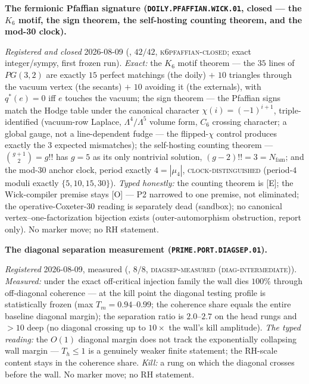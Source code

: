 \documentclass[11pt,a4paper]{article}
\newcommand{\Nfam}{N_{\mathrm{fam}}}
\begin{document}
\par\smallskip\noindent\textbf{The fermionic Pfaffian signature
(\texttt{DOILY.PFAFFIAN.\allowbreak WICK.01}, closed --- the
$K_6$ motif, the sign theorem, the self-hosting counting
theorem, and the mod-30 clock).}
{\sloppy
\emph{Registered and closed} 2026-08-09
(, $42/42$,
\textsc{k6pfaffian-closed}; exact integer/sympy, first frozen
run).  \emph{Exact:} the $K_6$ motif theorem --- the $35$ lines
of $PG(3,2)$ are exactly $15$ perfect matchings (the doily) $+$
$10$ triangles through the vacuum vertex (the secants) $+$ $10$
avoiding it (the externals), with $q^{*}(e) = 0$ iff $e$
touches the vacuum; the sign theorem --- the Pfaffian signs
match the Hodge table under the canonical character $\chi(i) =
(-1)^{i+1}$, triple-identified (vacuum-row Laplace,
$\Lambda^4/\Lambda^5$ volume form, $C_6$ crossing character; a
global gauge, not a line-dependent fudge --- the flipped-$\chi$
control produces exactly the $3$ expected mismatches); the
self-hosting counting theorem --- $\binom{g+1}{2} = g!!$ has $g
= 5$ as its only nontrivial solution, $(g-2)!! = 3 = \Nfam$;
and the mod-$30$ anchor clock, period exactly $4 = |\mu_4|$,
\textsc{clock-distinguished} (period-$4$ moduli exactly $\{5,
10, 15, 30\}$).  \emph{Typed honestly:} the counting theorem is
[E]; the Wick-compiler premise stays [O] --- P2 narrowed to one
premise, not eliminated; the operative-Coxeter-$30$ reading is
separately dead (sandbox); no canonical
vertex--one-factorization bijection exists (outer-automorphism
obstruction, report only).  No marker move; no RH
statement.\par}

\par\smallskip\noindent\textbf{The diagonal separation
measurement (\texttt{PRIME.PORT.\allowbreak DIAGSEP.01}).}
{\sloppy
\emph{Registered} 2026-08-09, measured
(, $8/8$,
\textsc{diagsep-measured (diag-intermediate)}).
\emph{Measured:} under the exact off-critical injection family
the wall dies $100\%$ through off-diagonal coherence --- at the
kill point the diagonal testing profile is statistically frozen
(max $T_m = 0.94$--$0.99$; the coherence share equals the
entire baseline diagonal margin); the separation ratio is
$2.0$--$2.7$ on the head rungs and $> 10$ deep (no diagonal
crossing up to $10\times$ the wall's kill amplitude).
\emph{The typed reading:} the $O(1)$ diagonal margin does not
track the exponentially collapsing wall margin --- $T_h \le 1$
is a genuinely weaker finite statement; the RH-scale content
stays in the coherence share.  \emph{Kill:} a rung on which the
diagonal crosses before the wall.  No marker move; no RH
statement.\par}
\end{document}
